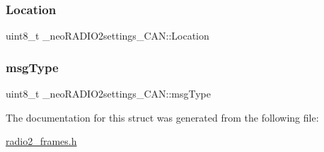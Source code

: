 \subsubsection{\texorpdfstring{Location}{Location}}
{\footnotesize\ttfamily uint8\+\_\+t \+\_\+neo\+R\+A\+D\+I\+O2settings\+\_\+\+C\+A\+N\+::\+Location}

\mbox{\label{struct__neo_r_a_d_i_o2settings___c_a_n_a3e9d35335d2bd0cf6743131a062f6849}} 
\subsubsection{\texorpdfstring{msg\+Type}{msgType}}
{\footnotesize\ttfamily uint8\+\_\+t \+\_\+neo\+R\+A\+D\+I\+O2settings\+\_\+\+C\+A\+N\+::msg\+Type}



The documentation for this struct was generated from the following file\+:\begin{DoxyCompactItemize}
\item 
\mbox{\hyperlink{radio2__frames_8h}{radio2\+\_\+frames.\+h}}\end{DoxyCompactItemize}
